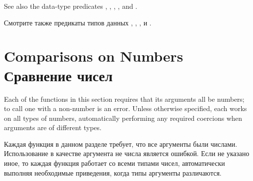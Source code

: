 See also the data-type predicates ,
, , , and .

Смотрите также предикаты типов данных ,
, ,  и .

\section{Comparisons on Numbers Сравнение чисел}

Each of the functions in this section requires that its arguments all be
numbers; to call one with a non-number is an error.  Unless otherwise
specified, each works on all types of numbers, automatically performing
any required coercions when arguments are of different types.

Каждая функция в данном разделе требует, что все аргументы были
числами. Использование в качестве аргумента не числа является ошибкой. Если не
указано иное, то каждая функция работает со всеми типами чисел, автоматически
выполняя необходимые приведения, когда типы аргументы различаются.

